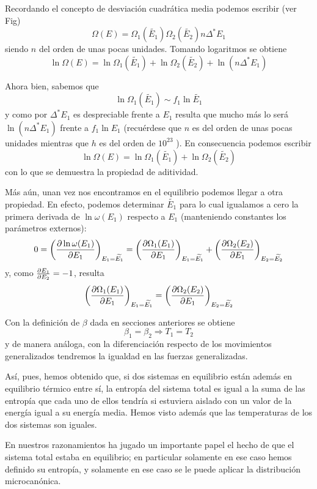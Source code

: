 Recordando el concepto de desviación cuadrática media podemos escribir (ver Fig)
$$\Omega(E) = \Omega_1(\widetilde{E_1}) \Omega_2(\widetilde{E_2})n\Delta^*E_1$$
siendo $n$ del orden de unas pocas unidades.
Tomando logaritmos se obtiene
\begin{equation}
	\ln \Omega(E) = \ln \Omega_1(\widetilde{E_1})  + \ln \Omega_2(\widetilde{E_2}) + \ln(n\Delta^*E_1)
\end{equation}

Ahora bien, sabemos que 
$$\ln \Omega_1(\widetilde{E_1}) \sim f_1\ln \widetilde{E_1}$$
y como por $\Delta^*E_1$ es despreciable frente a $E_1$ resulta que mucho más lo será $\ln (n\Delta^*E_1)$ frente a $f_1 \ln E_1$ (recuérdese que $n$ es del orden de unas pocas unidades mientras que $h$ es del orden de $10^{23}$ ).
En consecuencia podemos escribir
\begin{equation}
	\ln \Omega(E) = \ln \Omega_1(\widetilde{E_1})  + \ln \Omega_2(\widetilde{E_2})
\end{equation}
con lo que se demuestra la propiedad de aditividad.

Más aún, unan vez nos encontramos en el equilibrio podemos llegar a otra propiedad. En efecto, podemos
determinar $\widetilde{E_1}$ para lo cual igualamos a cero la primera derivada de $\ln \omega(E_1)$ respecto
a $E_1$ (manteniendo constantes los parámetros externos):
$$0 = \left( \pdv{\ln \omega(E_1)}{E_1}\right)_{E_1 = \widetilde{E_1}}  = \left( \pdv{\Omega_1(E_1)}{E_1} \right)_{E_1 = \widetilde{E_1}} + \left( \pdv{\Omega_2(E_2)}{E_1} \right)_{E_2 = \widetilde{E_2}}$$
y, como $\pdv{E_1}{E_2} = -1 $, resulta
\begin{equation}
	\left( \pdv{\Omega_1(E_1)}{E_1}\right)_{E_1 = \widetilde{E_1}} = \left(  \pdv{\Omega_2(E_2)}{E_1}\right)_{E_2 = \widetilde{E_2}}
\end{equation}

Con la definición de $\beta$ dada en secciones anteriores se obtiene
\begin{equation}
	\beta_1 = \beta_2 \Rightarrow \boxed{T_1 = T_2}
\end{equation}
y de manera análoga, con la diferenciación respecto de los movimientos generalizados tendremos la igualdad en las fuerzas generalizadas.

Así, pues, hemos obtenido que, si dos sistemas en equilibrio están además en equilibrio térmico entre sí, la entropía del sistema total es igual a la suma de las entropía que cada uno de ellos tendría si estuviera aislado con un valor de la energía igual a su energía media.
Hemos visto además que las temperaturas de los dos sistemas son iguales.

En nuestros razonamientos ha jugado un importante papel el hecho de que el sistema total estaba en equilibrio; en particular solamente en ese caso hemos definido su entropía, y solamente en ese caso se le puede aplicar la distribución microcanónica.



